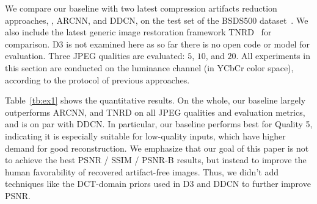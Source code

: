 \documentclass[10pt,twocolumn,letterpaper]{article}
\begin{document}
We compare our baseline with two latest compression artifacts reduction approaches, \ie, ARCNN, and DDCN, on the test set of the BSDS500 dataset~\cite{bsds500}. We also include the latest generic image restoration framework TNRD~\cite{tnrd} for comparison. D3 is not examined here as so far there is no open code or model for evaluation. Three JPEG qualities are evaluated: $5$, $10$, and $20$. All experiments in this section are conducted on the luminance channel (in YCbCr color space), according to the protocol of previous approaches.

Table~\ref{tb:ex1} shows the quantitative results. On the whole, our baseline largely outperforms ARCNN, and TNRD on all JPEG qualities and evaluation metrics, and is on par with DDCN. In particular, our baseline performs best for Quality 5, indicating it is especially suitable for low-quality inputs, which have higher demand for good reconstruction. We emphasize that our goal of this paper is not to achieve the best PSNR / SSIM / PSNR-B results, but instead to improve the human favorability of recovered artifact-free images. Thus, we didn't add techniques like the DCT-domain priors used in D3 and DDCN to further improve PSNR.
\end{document}
